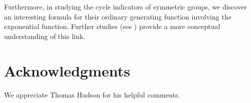 \documentclass[a4paper,11pt]{article}
\numberwithin{equation}{section}
\begin{document}
    Furthermore, in studying the cycle indicators of symmetric groups, we discover an interesting formula for their ordinary generating function involving the exponential function. Further studies (see \cite[p.~19]{stanleyEnumerativeCombinatoricsVolume1999}) provide a more conceptual understanding of this link.

    

    \section*{Acknowledgments}

    We appreciate Thomas Hudson for his helpful comments. 

    
    
    

    
\end{document}
